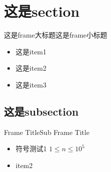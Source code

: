 \section{这是section}
\begin{frame}{这是frame大标题}{这是frame小标题}
	\begin{itemize}[<+->]
		\item
		这是item1
		\item
		这是item2
		\item
		这是item3
	\end{itemize}
\end{frame}

\subsection{这是subsection}
\begin{frame}[t]{Frame Title}{Sub Frame Title}
	\begin{itemize}
		\item
		符号测试1 $1\leqslant n \leqslant 10^{5}$
		\item
		item2
	\end{itemize}
\end{frame}